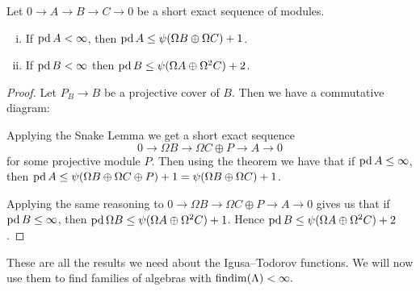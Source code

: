 \begin{cor}\label{cor:projdim_bounded_by_psi}
	Let $0 \to A \to B \to C \to 0$ be a short exact sequence of modules. 
	\begin{enumerate}[i)]
		\item \label{cor:projdim_bounded_by_psi_i}
		If $\operatorname{pd} A < \infty$, then $\operatorname{pd} A \leq \psi(\Omega B \oplus \Omega C)+1$.
		\item \label{cor:projdim_bounded_by_psi_ii}
		If $\operatorname{pd} B < \infty$ then $\operatorname{pd} B \leq \psi(\Omega A \oplus \Omega^2 C) + 2$.
	\end{enumerate}
	\begin{proof}
		Let $P_B \to B$ be a projective cover of $B$. Then we have a commutative diagram:
		\begin{center}
		\end{center}
		Applying the Snake Lemma we get a short exact sequence $$0 \to \Omega B \to \Omega C \oplus P \to A \to 0$$ for some projective module $P$. Then using the theorem we have that if $\operatorname{pd} A \leq \infty$, then $\operatorname{pd} A \leq \psi(\Omega B \oplus \Omega C \oplus P) + 1 = \psi(\Omega B \oplus \Omega C) + 1$.
		
		Applying the same reasoning to $0 \to \Omega B \to \Omega C \oplus P \to A \to 0$ gives us that if $\operatorname{pd} B \leq \infty$, then $\operatorname{pd}\Omega B \leq \psi(\Omega A \oplus \Omega^2 C) + 1$. Hence $\operatorname{pd} B \leq  \psi(\Omega A \oplus \Omega^2 C) + 2$.
	\end{proof}
\end{cor}

These are all the results we need about the Igusa--Todorov functions. We will now use them to find families of algebras with $\operatorname{findim}(\Lambda) < \infty.$


